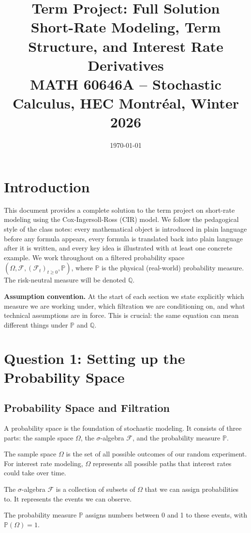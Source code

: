\documentclass[11pt]{article}
\title{\textbf{Term Project: Full Solution}\\
\large Short-Rate Modeling, Term Structure, and Interest Rate Derivatives\\
\normalsize MATH 60646A -- Stochastic Calculus, HEC Montr\'eal, Winter 2026}
\author{}
\date{\today}
\newcommand{\PP}{\mathbb{P}}
\newcommand{\QQ}{\mathbb{Q}}
\newcommand{\FF}{\mathcal{F}}
\begin{document}
\maketitle
\tableofcontents
\newpage

\section{Introduction}

This document provides a complete solution to the term project on short-rate modeling using the Cox-Ingersoll-Ross (CIR) model. We follow the pedagogical style of the class notes: every mathematical object is introduced in plain language before any formula appears, every formula is translated back into plain language after it is written, and every key idea is illustrated with at least one concrete example. We work throughout on a filtered probability space $(\Omega,\FF,(\FF_t)_{t\ge 0},\PP)$, where $\PP$ is the physical (real-world) probability measure. The risk-neutral measure will be denoted $\QQ$.

\textbf{Assumption convention.} At the start of each section we state explicitly which measure we are working under, which filtration we are conditioning on, and what technical assumptions are in force. This is crucial: the same equation can mean different things under $\PP$ and $\QQ$.

\section{Question 1: Setting up the Probability Space}

\subsection{Probability Space and Filtration}

A probability space is the foundation of stochastic modeling. It consists of three parts: the sample space $\Omega$, the $\sigma$-algebra $\FF$, and the probability measure $\PP$.

The sample space $\Omega$ is the set of all possible outcomes of our random experiment. For interest rate modeling, $\Omega$ represents all possible paths that interest rates could take over time.

The $\sigma$-algebra $\FF$ is a collection of subsets of $\Omega$ that we can assign probabilities to. It represents the events we can observe.

The probability measure $\PP$ assigns numbers between 0 and 1 to these events, with $\PP(\Omega) = 1$.
\end{document}
